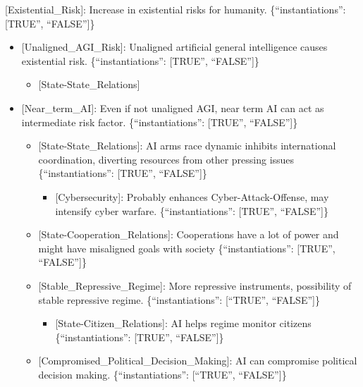 \documentclass[
  11pt,
  letterpaper,
]{book}
\providecommand{\tightlist}{%
  \setlength{\itemsep}{0pt}\setlength{\parskip}{0pt}}
\begin{document}
{[}Existential\_Risk{]}: Increase in existential risks for humanity.
\{``instantiations'': {[}TRUE'', ``FALSE''{]}\}

\begin{itemize}
\tightlist
\item
  {[}Unaligned\_AGI\_Risk{]}: Unaligned artificial general intelligence
  causes existential risk. \{``instantiations'': {[}TRUE'',
  ``FALSE''{]}\}

  \begin{itemize}
  \tightlist
  \item
    {[}State-State\_Relations{]}
  \end{itemize}
\item
  {[}Near\_term\_AI{]}: Even if not unaligned AGI, near term AI can act
  as intermediate risk factor. \{``instantiations'': {[}TRUE'',
  ``FALSE''{]}\}

  \begin{itemize}
  \tightlist
  \item
    {[}State-State\_Relations{]}: AI arms race dynamic inhibits
    international coordination, diverting resources from other pressing
    issues \{``instantiations'': {[}TRUE'', ``FALSE''{]}\}

    \begin{itemize}
    \tightlist
    \item
      {[}Cybersecurity{]}: Probably enhances Cyber-Attack-Offense, may
      intensify cyber warfare. \{``instantiations'': {[}TRUE'',
      ``FALSE''{]}\}
    \end{itemize}
  \item
    {[}State-Cooperation\_Relations{]}: Cooperations have a lot of power
    and might have misaligned goals with society \{``instantiations'':
    {[}TRUE'', ``FALSE''{]}\}
  \item
    {[}Stable\_Repressive\_Regime{]}: More repressive instruments,
    possibility of stable repressive regime. \{``instantiations'':
    {[}``TRUE'', ``FALSE''{]}\}

    \begin{itemize}
    \tightlist
    \item
      {[}State-Citizen\_Relations{]}: AI helps regime monitor citizens
      \{``instantiations'': {[}TRUE'', ``FALSE''{]}\}
    \end{itemize}
  \item
    {[}Compromised\_Political\_Decision\_Making{]}: AI can compromise
    political decision making. \{``instantiations'': {[}``TRUE'',
    ``FALSE''{]}\}


\end{itemize}
\end{itemize}
\end{document}
